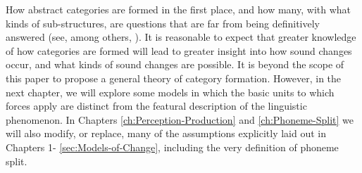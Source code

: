 How abstract categories are formed in the first place, and how many,
with what kinds of sub-structures, are questions that are far from
being definitively answered (see, among others, \citet{Peperkamp2006,dillon2013single,feldman2009learning,mcmurray2011information,goldsmith2009learning}).
It is reasonable to expect that greater knowledge of how categories
are formed will lead to greater insight into how sound changes occur,
and what kinds of sound changes are possible. It is beyond the scope
of this paper to propose a general theory of category formation. However,
in the next chapter, we will explore some models in which the basic
units to which forces apply are distinct from the featural description
of the linguistic phenomenon. In Chapters \ref{ch:Perception-Production}
and \ref{ch:Phoneme-Split} we will also modify, or replace, many
of the assumptions explicitly laid out in Chapters 1- \ref{sec:Models-of-Change},
including the very definition of phoneme split.
